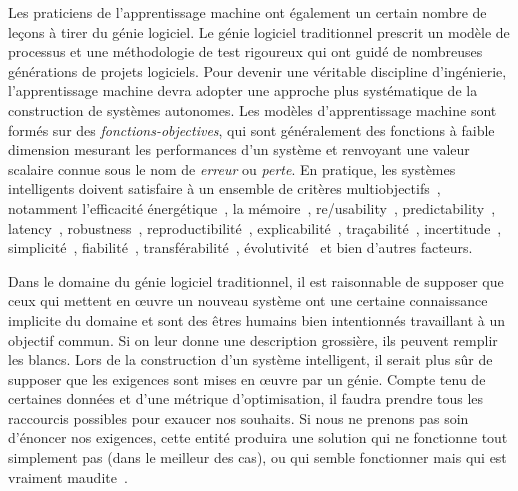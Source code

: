 Les praticiens de l'apprentissage machine ont également un certain nombre de leçons à tirer du génie logiciel. Le génie logiciel traditionnel prescrit un modèle de processus et une méthodologie de test rigoureux qui ont guidé de nombreuses générations de projets logiciels. Pour devenir une véritable discipline d'ingénierie, l'apprentissage machine devra adopter une approche plus systématique de la construction de systèmes autonomes. Les modèles d'apprentissage machine sont formés sur des \textit{fonctions-objectives}, qui sont généralement des fonctions à faible dimension mesurant les performances d'un système et renvoyant une valeur scalaire connue sous le nom de \textit{erreur} ou \textit{perte}. En pratique, les systèmes intelligents doivent satisfaire à un ensemble de critères multiobjectifs~\citep{censi2015mathématiques}, notamment l'efficacité énergétique~\citep{paull2010novel}, la mémoire~\citep{memory2013mitliagkas}, re/usability~\citep{breuleux2017automatic,deleu2019torchmeta}, predictability~\citep{turner2017well}, latency~\citep{ravanelli2018twin}, robustness~\citep{pineau2003policy}, reproductibilité~\citep{pineau2019improving}, explicabilité~\citep{turner2016model}, traçabilité~\citep{guo2017semantically, tsirigotis2018orion}, incertitude~\citep{diaz2018interactive}, simplicité~\citep{kastner2019representation}, fiabilité~\citep{xu2017efficient}, transférabilité~\citep{mehta2019active}, évolutivité~\citep{luan2019break} et bien d'autres facteurs.

Dans le domaine du génie logiciel traditionnel, il est raisonnable de supposer que ceux qui mettent en œuvre un nouveau système ont une certaine connaissance implicite du domaine et sont des êtres humains bien intentionnés travaillant à un objectif commun. Si on leur donne une description grossière, ils peuvent remplir les blancs. Lors de la construction d'un système intelligent, il serait plus sûr de supposer que les exigences sont mises en œuvre par un génie. Compte tenu de certaines données et d'une métrique d'optimisation, il faudra prendre tous les raccourcis possibles pour exaucer nos souhaits. Si nous ne prenons pas soin d'énoncer nos exigences, cette entité produira une solution qui ne fonctionne tout simplement pas (dans le meilleur des cas), ou qui semble fonctionner mais qui est vraiment maudite~\citep{bellman1957dynamic}.

